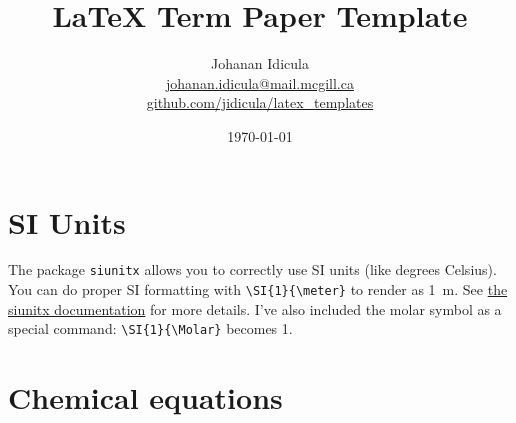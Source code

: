 \documentclass[titlepage,12pt]{article}
\begin{document}
\title{\textbf{\LaTeX{} Term Paper Template}}

\date{\today}
\author{
		Johanan Idicula \\
		\href{mailto:johanan.idicula@mail.mcgill.ca}{johanan.idicula@mail.mcgill.ca} \\
		\href{https://github.com/jidicula/latex_templates}{github.com/jidicula/latex\_templates}
		 }

\maketitle
\pagestyle{fancy}
\fancyhf{}
\setlength\headheight{15pt}
\fancyhead[C]{\thetitle}
\fancyfoot[C]{\thepage}


\tableofcontents
\newpage


\section{SI Units}

The package \texttt{siunitx} allows you to correctly use SI units (like degrees Celsius). You can do proper SI formatting with \texttt{\textbackslash SI\{1\}\{\textbackslash meter\}} to render as \SI{1}{\meter}. See \href{http://ctan.mirror.rafal.ca/macros/latex/contrib/siunitx/siunitx.pdf}{the siunitx documentation} for more details. I've also included the molar symbol as a special command: \texttt{\textbackslash SI\{1\}\{\textbackslash Molar\}} becomes \SI{1}{\Molar}.

\section{Chemical equations}
\end{document}
